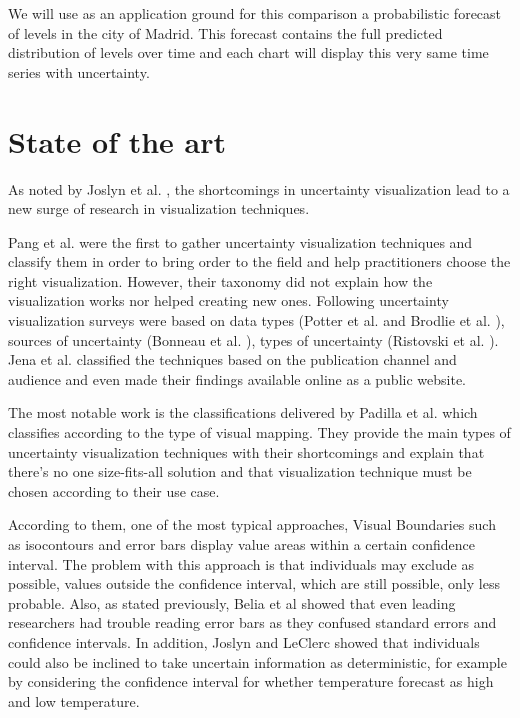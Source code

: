 \documentclass[a4paper,3p,sort&compress]{elsarticle}
\begin{document}
We will use as an application ground for this comparison a probabilistic forecast of \no levels 
in the city of Madrid. This forecast contains the full predicted distribution of \no levels over time
and each chart will display this very same time series with uncertainty. 

\section{State of the art}
\label{sec:results}

As noted by Joslyn et al. \cite{joslyn_communicating_2010}, the shortcomings in uncertainty visualization lead to a new surge of 
research in visualization techniques. 

Pang et al. \cite{pang_approaches_1997} were the first to gather uncertainty visualization techniques and classify them in 
order to bring order to the field and help 
practitioners choose the right visualization. However, their taxonomy did not explain how the visualization works nor helped creating new 
ones. Following uncertainty visualization surveys were based on data types (Potter et al. \cite{potter_quantification_2012} and Brodlie et al. 
\cite{brodlie_review_2012}), 
sources of uncertainty (Bonneau et al. \cite{bonneau_overview_2014}), types of uncertainty 
(Ristovski et al. \cite{ristovski_uncertainty_2014}). Jena et al. \cite{jena_uncertainty_2020} classified the techniques 
based on the publication channel and audience and even made their findings available online as a 
public website. 

The most notable work is the classifications delivered by Padilla et al. \cite{padilla_uncertainty_2021} which classifies according to 
the type of visual mapping. They provide the main types of uncertainty visualization techniques with their shortcomings and 
explain that there's no one size-fits-all solution and that visualization technique must be chosen according to their use case.

According to them, one of the most typical approaches, Visual Boundaries such as isocontours and error 
bars display value areas within a certain confidence interval. The problem with this approach is 
that individuals may exclude as possible, values outside the confidence interval, which are still 
possible, only less probable. Also, as stated previously, Belia et al \cite{belia_researchers_2005} showed that even leading researchers had 
trouble reading error bars as they confused 
standard errors and confidence intervals. In addition, Joslyn and LeClerc \cite{joslyn_decisions_2013} 
showed that individuals could also be inclined to take uncertain 
information as deterministic, for example by considering the confidence interval for whether temperature 
forecast as high and low temperature. 
\end{document}
